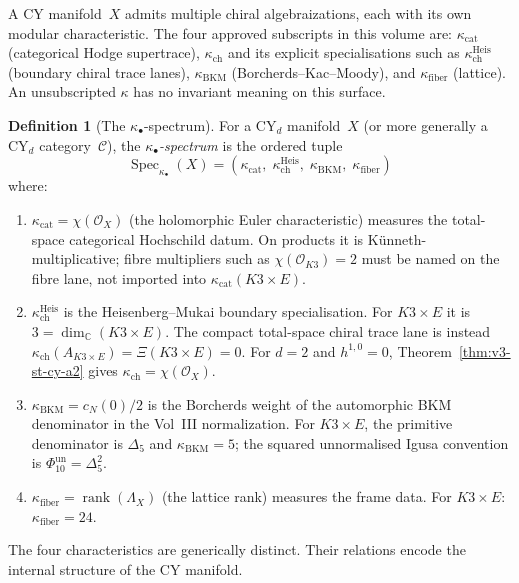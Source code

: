 \documentclass[11pt]{article}
\theoremstyle{plain}
\theoremstyle{definition}
\newtheorem{definition}[theorem]{Definition}
\theoremstyle{remark}
\newcommand{\cC}{\mathcal{C}}
\newcommand{\cO}{\mathcal{O}}
\newcommand{\bC}{\mathbb{C}}
\DeclareMathOperator{\Spec}{Spec}
\begin{document}
A CY manifold~$X$ admits multiple chiral algebraizations, each
with its own modular characteristic.  The four approved subscripts
in this volume are: $\kappa_{\mathrm{cat}}$ (categorical Hodge
supertrace), $\kappa_{\mathrm{ch}}$ and its explicit specialisations
such as $\kappa_{\mathrm{ch}}^{\mathrm{Heis}}$ (boundary chiral
trace lanes), $\kappa_{\mathrm{BKM}}$ (Borcherds--Kac--Moody), and
$\kappa_{\mathrm{fiber}}$ (lattice).
An unsubscripted $\kappa$ has no invariant meaning on this surface.

\begin{definition}[The $\kappa_\bullet$-spectrum]
\label{def:v3-st-kappa-spectrum}
For a CY$_d$ manifold~$X$ (or more generally a CY$_d$
category~$\cC$), the \emph{$\kappa_\bullet$-spectrum} is the
ordered tuple
\[
 \Spec_{\kappa_\bullet}(X)
 = (\kappa_{\mathrm{cat}},\; \kappa_{\mathrm{ch}}^{\mathrm{Heis}},\;
 \kappa_{\mathrm{BKM}},\; \kappa_{\mathrm{fiber}})
\]
where:
\begin{enumerate}[label=(\roman*)]
 \item $\kappa_{\mathrm{cat}} = \chi(\cO_X)$
 (the holomorphic Euler characteristic) measures the total-space
 categorical Hochschild datum.  On products it is
 K\"unneth-multiplicative; fibre multipliers such as
 $\chi(\cO_{K3})=2$ must be named on the fibre lane, not imported into
 $\kappa_{\mathrm{cat}}(K3\times E)$.
 \item $\kappa_{\mathrm{ch}}^{\mathrm{Heis}}$ is the
 Heisenberg--Mukai boundary specialisation.  For $K3\times E$ it is
 $3=\dim_\bC(K3\times E)$.  The compact total-space chiral trace lane
 is instead $\kappa_{\mathrm{ch}}(A_{K3\times E})=\Xi(K3\times E)=0$.
 For $d = 2$ and $h^{1,0}=0$, Theorem~\ref{thm:v3-st-cy-a2} gives
 $\kappa_{\mathrm{ch}}=\chi(\cO_X)$.
 \item $\kappa_{\mathrm{BKM}}=c_N(0)/2$ is the Borcherds weight of
 the automorphic BKM denominator in the Vol~III normalization.
 For $K3 \times E$, the primitive denominator is $\Delta_5$ and
 $\kappa_{\mathrm{BKM}}=5$; the squared unnormalised Igusa convention is
 $\Phi_{10}^{\mathrm{un}}=\Delta_5^2$.
 \item $\kappa_{\mathrm{fiber}} = \operatorname{rank}(\Lambda_X)$
 (the lattice rank) measures the frame data.  For $K3 \times E$:
 $\kappa_{\mathrm{fiber}} = 24$.
\end{enumerate}
\end{definition}

The four characteristics are generically distinct.  Their relations
encode the internal structure of the CY manifold.
\end{document}
